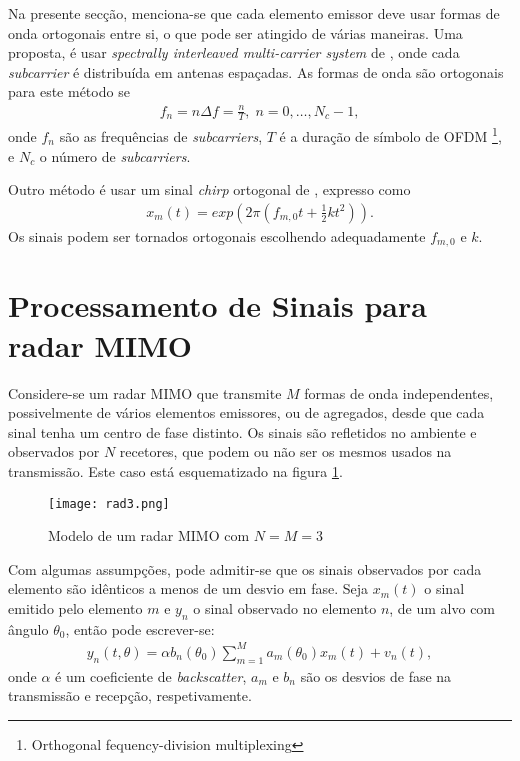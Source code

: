 \documentclass[purist,portuguese]{ist-report}
\begin{document}
Na presente secção, menciona-se que cada elemento emissor deve usar formas de onda ortogonais entre si, o que pode ser atingido de várias maneiras.
Uma proposta, é usar \textit{spectrally interleaved multi-carrier system} de \cite{sturm2013spectrally}, onde cada \textit{subcarrier} é distribuída em antenas espaçadas.
As formas de onda são ortogonais para este método se 
\begin{align}
  f_n = n\Delta f = \frac{n}{T}, \; n=0,\ldots,N_c -1,
  \label{eq:orth}
\end{align}
onde $f_n$ são as frequências de \textit{subcarriers}, $T$ é a duração de símbolo de OFDM \footnote{Orthogonal fequency-division multiplexing}, e $N_c$ o número de \textit{subcarriers}.

Outro método é usar um sinal \textit{chirp} ortogonal de \cite{chen2008mimo}, expresso como
\begin{align}
  x_m(t)= exp\left( 2\pi \left( f_{m,0}t+\frac{1}{2}kt^2 \right) \right).
  \label{eq:chirp}
\end{align}
Os sinais podem ser tornados ortogonais escolhendo adequadamente $f_{m,0}$ e $k$.


\section{Processamento de Sinais para radar MIMO}

Considere-se um radar MIMO que transmite $M$ formas de onda independentes, possivelmente de vários elementos emissores, ou de agregados, desde que cada sinal tenha um centro de fase distinto.
Os sinais são refletidos no ambiente e observados por $N$ recetores, que podem ou não ser os mesmos usados na transmissão.
Este caso está esquematizado na figura \ref{fig:rad3}.

\begin{figure}[hp]
  \centering
  \texttt{[image: rad3.png]}
  \caption{Modelo de um radar MIMO com $N=M=3$}
  \label{fig:rad3}
\end{figure}

Com algumas assumpções, pode admitir-se que os sinais observados por cada elemento são idênticos a menos de um desvio em fase.
Seja $x_m(t)$ o sinal emitido pelo elemento $m$ e $y_n$ o sinal observado no elemento $n$, de um alvo com ângulo $\theta_0$, então pode escrever-se:
\begin{align}
  y_n(t,\theta) = \alpha b_n(\theta_0) \sum_{m=1}^{M}a_m(\theta_0)x_m(t) + v_n(t),
  \label{eq:proc1}
\end{align}
onde $\alpha$ é um coeficiente de \textit{backscatter}, $a_m$ e $b_n$ são os desvios de fase na transmissão e recepção, respetivamente.
\end{document}
